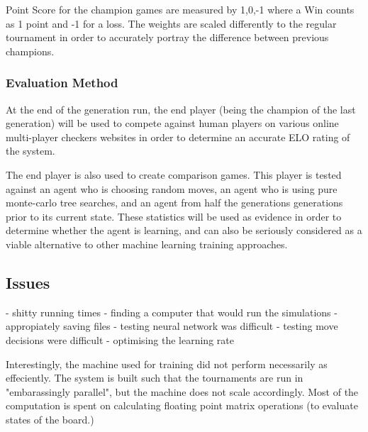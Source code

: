 \documentclass[12pt,a4paper]{article}
\begin{document}
        Point Score for the champion games are measured by {1,0,-1} where a Win counts as 1 point and -1 for a loss. The weights are scaled differently to the regular tournament in order to accurately portray the difference between previous champions.
    
        \subsubsection*{Evaluation Method}
    
        At the end of the generation run, the end player (being the champion of the last generation) will be used to compete against human players on various online multi-player checkers websites in order to determine an accurate ELO rating of the system.
    
        The end player is also used to create comparison games. This player is tested against an agent who is choosing random moves, an agent who is using pure monte-carlo tree searches, and an agent from half the generations generations prior to its current state. These statistics will be used as evidence in order to determine whether the agent is learning, and can also be seriously considered as a viable alternative to other machine learning training approaches.
    
    \subsection{Issues}
        - shitty running times
        - finding a computer that would run the simulations
        - appropiately saving files
        - testing neural network was difficult
        - testing move decisions were difficult
        - optimising the learning rate

    Interestingly, the machine used for training did not perform necessarily as effeciently. The system is built such that the tournaments are run in "embarassingly parallel", but the machine does not scale accordingly. Most of the computation is spent on calculating floating point matrix operations (to evaluate states of the board.)
\end{document}
